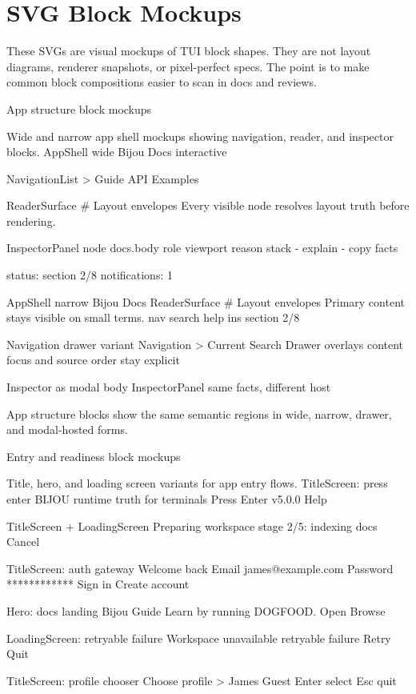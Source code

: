 \section{SVG Block Mockups}\label{record-128-svg-block-mockups}

These SVGs are visual mockups of TUI block shapes. They are not layout diagrams, renderer snapshots, or pixel-perfect specs. The point is to make common block compositions easier to scan in docs and reviews.

App structure block mockups

Wide and narrow app shell mockups showing navigation, reader, and inspector blocks. AppShell wide Bijou Docs interactive

NavigationList \textgreater{} Guide API Examples

ReaderSurface \# Layout envelopes Every visible node resolves layout truth before rendering.

InspectorPanel node docs.body role viewport reason stack - explain - copy facts

status: section 2/8 notifications: 1

AppShell narrow Bijou Docs ReaderSurface \# Layout envelopes Primary content stays visible on small terms. nav search help ins section 2/8

Navigation drawer variant Navigation \textgreater{} Current Search Drawer overlays content focus and source order stay explicit

Inspector as modal body InspectorPanel same facts, different host

App structure blocks show the same semantic regions in wide, narrow, drawer, and modal-hosted forms.

Entry and readiness block mockups

Title, hero, and loading screen variants for app entry flows. TitleScreen: press enter BIJOU runtime truth for terminals Press Enter v5.0.0 Help

TitleScreen + LoadingScreen Preparing workspace stage 2/5: indexing docs Cancel

TitleScreen: auth gateway Welcome back Email james@example.com Password ************ Sign in Create account

Hero: docs landing Bijou Guide Learn by running DOGFOOD. Open Browse

LoadingScreen: retryable failure Workspace unavailable retryable failure Retry Quit

TitleScreen: profile chooser Choose profile \textgreater{} James Guest Enter select Esc quit

